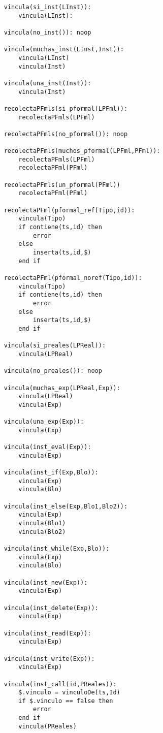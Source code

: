 \begin{lstlisting}
    vincula(si_inst(LInst)):
        vincula(LInst):

    vincula(no_inst()): noop

    vincula(muchas_inst(LInst,Inst)):
        vincula(LInst)
        vincula(Inst)

    vincula(una_inst(Inst)):
        vincula(Inst)

    recolectaPFmls(si_pformal(LPFml)):
        recolectaPFmls(LPFml)

    recolectaPFmls(no_pformal()): noop

    recolectaPFmls(muchos_pformal(LPFml,PFml)):
        recolectaPFmls(LPFml)
        recolectaPFml(PFml)

    recolectaPFmls(un_pformal(PFml))
        recolectaPFml(PFml)

    recolectaPFml(pformal_ref(Tipo,id)):
        vincula(Tipo)
        if contiene(ts,id) then
            error
        else
            inserta(ts,id,$)
        end if

    recolectaPFml(pformal_noref(Tipo,id)):
        vincula(Tipo)
        if contiene(ts,id) then
            error
        else
            inserta(ts,id,$)
        end if

    vincula(si_preales(LPReal)):
        vincula(LPReal)

    vincula(no_preales()): noop

    vincula(muchas_exp(LPReal,Exp)):
        vincula(LPReal)
        vincula(Exp)

    vincula(una_exp(Exp)):
        vincula(Exp)

    vincula(inst_eval(Exp)):
        vincula(Exp)

    vincula(inst_if(Exp,Blo)):
        vincula(Exp)
        vincula(Blo)

    vincula(inst_else(Exp,Blo1,Blo2)):
        vincula(Exp)
        vincula(Blo1)
        vincula(Blo2)

    vincula(inst_while(Exp,Blo)):
        vincula(Exp)
        vincula(Blo)

    vincula(inst_new(Exp)):
        vincula(Exp)

    vincula(inst_delete(Exp)):
        vincula(Exp)

    vincula(inst_read(Exp)):
        vincula(Exp)

    vincula(inst_write(Exp)):
        vincula(Exp)

    vincula(inst_call(id,PReales)):
        $.vinculo = vinculoDe(ts,Id)
        if $.vinculo == false then
            error
        end if
        vincula(PReales)


\end{lstlisting}

